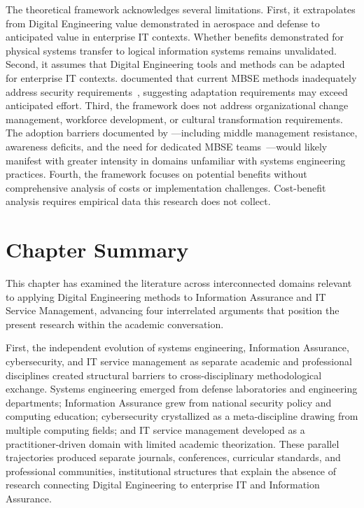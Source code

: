 The theoretical framework acknowledges several limitations. First, it extrapolates from Digital Engineering value demonstrated in aerospace and defense to anticipated value in enterprise IT contexts. Whether benefits demonstrated for physical systems transfer to logical information systems remains unvalidated. Second, it assumes that Digital Engineering tools and methods can be adapted for enterprise IT contexts. \citeauthor{Mazeika_Butleris_2020} documented that current MBSE methods inadequately address security requirements~\parencite{Mazeika_Butleris_2020}, suggesting adaptation requirements may exceed anticipated effort. Third, the framework does not address organizational change management, workforce development, or cultural transformation requirements. The adoption barriers documented by \citeauthor{Henderson_McDermott_Salado_2024}---including middle management resistance, awareness deficits, and the need for dedicated MBSE teams~\parencite{Henderson_McDermott_Salado_2024}---would likely manifest with greater intensity in domains unfamiliar with systems engineering practices. Fourth, the framework focuses on potential benefits without comprehensive analysis of costs or implementation challenges. Cost-benefit analysis requires empirical data this research does not collect.

\section{Chapter Summary}

This chapter has examined the literature across interconnected domains relevant to applying Digital Engineering methods to Information Assurance and IT Service Management, advancing four interrelated arguments that position the present research within the academic conversation.

First, the independent evolution of systems engineering, Information Assurance, cybersecurity, and IT service management as separate academic and professional disciplines created structural barriers to cross-disciplinary methodological exchange. Systems engineering emerged from defense laboratories and engineering departments; Information Assurance grew from national security policy and computing education; cybersecurity crystallized as a meta-discipline drawing from multiple computing fields; and IT service management developed as a practitioner-driven domain with limited academic theorization. These parallel trajectories produced separate journals, conferences, curricular standards, and professional communities, institutional structures that explain the absence of research connecting Digital Engineering to enterprise IT and Information Assurance.

